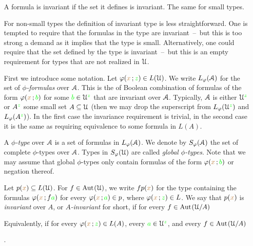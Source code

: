A formula is invariant if the set it defines is invariant.
The same for small types.

For non-small types the definition of invariant type is less straightforward.
One is tempted to require that the formulas in the type are invariant~--~but this is too strong a demand as it implies that the type is small.
Alternatively, one could require that the set defined by the type is invariant~--~but this is an empty requirement for types that are not realized in $\EuScript U$.

First we introduce some notation.
Let $\varphi({\color{brown} x}\,;{\color{green} z})\in L(\EuScript U)$.
We write $L_{\varphi}(\EuScript A)$ for the set of \emph{$\phi$-formulas\/} over $\EuScript A$.
This is the of Boolean combination of formulas of the form $\varphi({\color{brown} x}\,;{\color{green} b})$ for some ${\color{green} b}\in\EuScript U^{\color{green} z}$ that are invariant over $\EuScript A$.
Typically, $\EuScript A$ is either $\EuScript U^{\color{green} z}$ or $A^{\color{green} z}$ some small set $A\subseteq\EuScript U$ (then we may drop the superscript from $L_{\varphi}(\EuScript U^{\color{green} z})$ and $L_{\varphi}(A^{\color{green} z})$).
In the first case the invariance requirement is trivial, in the second case it is the same as requiring equivalence to some formula in $L(A)$.

A \emph{$\phi$-type\/} over $\EuScript A$ is a set of formulas in $L_{\varphi}(\EuScript A)$.
We denote by \emph{$S_\varphi(\EuScript A)$\/} the set of complete $\phi$-types over $\EuScript A$.
Types in \emph{$S_{\varphi}(\EuScript U)$\/} are called \emph{global $\phi$-types.}
Note that we may assume that global $\phi$-types only contain formulas of the form $\varphi({\color{brown} x}\,;{\color{green} b})$ or negation thereof.

Let $p({\color{brown} x})\subseteq L(\EuScript U)$.
For $f\in{\rm Aut\kern.15ex}(\EuScript U)$, we write $fp({\color{brown} x})$ for the type containing the formulas $\varphi({\color{brown} x}\,;f{\color{green} a})$ for every $\varphi({\color{brown} x}\,;{\color{green} a})\in p$, where $\varphi({\color{brown} x}\,;{\color{green} z})\in L$.
We say that $p({\color{brown} x})$ is \emph{invariant\/} over $A$, or \emph{$A$-invariant\/} for short, if for every $f\in{\rm Aut\kern.15ex}(\EuScript U/A)$


Equivalently, if for every $\varphi({\color{brown} x}\,;{\color{green} z})\in L(A)$, every ${\color{green} a}\in\EuScript U^{\color{green} z}$, and every $f\in{\rm Aut\kern.15ex}(\EuScript U/A)$

.

